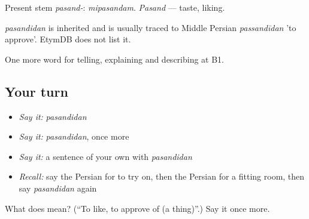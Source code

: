Present stem \emph{pasand-}: \emph{mipasandam}. \emph{Pasand} — taste, liking.

\begin{cousinweb}
\emph{pasandidan} is inherited and is usually traced to Middle Persian \emph{passandīdan} 'to approve'. EtymDB does not list it.
\end{cousinweb}

\begin{grammarlens}[title={What you've built}]
One more word for telling, explaining and describing at B1.
\end{grammarlens}

\subsection*{Your turn}
\begin{itemize}
\raggedright
  \item \emph{Say it:} \emph{pasandidan}
  \item \emph{Say it:} \emph{pasandidan}, once more
  \item \emph{Say it:} a sentence of your own with \emph{pasandidan}
  \item \emph{Recall:} say the Persian for to try on, then the Persian for a fitting room, then say \emph{pasandidan} again
\end{itemize}

\begin{tcolorbox}[breakable,colback=teal!4,colframe=teal!35!black,title={Before you move on}]
What does  mean? (\textquotedblleft{}To like, to approve of (a thing)\textquotedblright{}.) Say it once more.
\end{tcolorbox}
